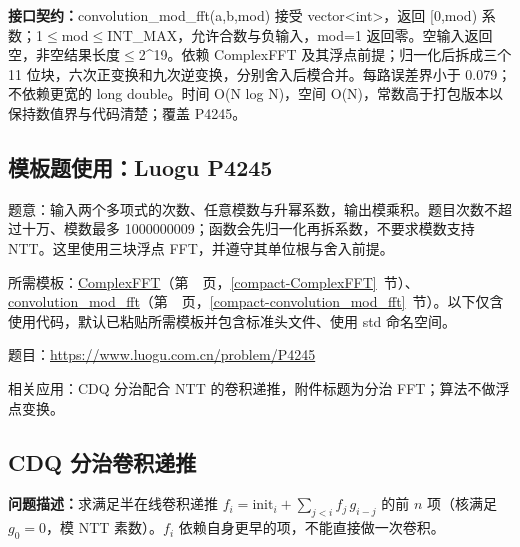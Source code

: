 {\sloppy{}\noindent\textbf{接口契约：}convolution\_mod\_fft(a,b,mod) 接受 vector<int>，返回 [0,mod) 系数；1$\le$mod$\le$INT\_MAX，允许合数与负输入，mod=1 返回零。空输入返回空，非空结果长度$\le$2\textasciicircum{}19。依赖 ComplexFFT 及其浮点前提；归一化后拆成三个 11 位块，六次正变换和九次逆变换，分别舍入后模合并。每路误差界小于 0.079；不依赖更宽的 long double。时间 O(N log N)，空间 O(N)，常数高于打包版本以保持数值界与代码清楚；覆盖 P4245。\par}



\Needspace{317pt}

\subsection*{模板题使用：Luogu P4245}

\label{usage-example-122}

题意：输入两个多项式的次数、任意模数与升幂系数，输出模乘积。题目次数不超过十万、模数最多 1000000009；函数会先归一化再拆系数，不要求模数支持 NTT。这里使用三块浮点 FFT，并遵守其单位根与舍入前提。

所需模板：\hyperref[compact-ComplexFFT]{ComplexFFT}（第~\pageref{compact-ComplexFFT}~页，\ref{compact-ComplexFFT}~节）、\hyperref[compact-convolution_mod_fft]{convolution\_\allowbreak{}mod\_\allowbreak{}fft}（第~\pageref{compact-convolution_mod_fft}~页，\ref{compact-convolution_mod_fft}~节）。以下仅含使用代码，默认已粘贴所需模板并包含标准头文件、使用 std 命名空间。

题目：\url{https://www.luogu.com.cn/problem/P4245}



\newpage

\Needspace{519pt}

\noindent 相关应用：CDQ 分治配合 NTT 的卷积递推，附件标题为分治 FFT；算法不做浮点变换。

\subsection{CDQ 分治卷积递推}\label{compact-cdq_convolution}

\noindent\textbf{问题描述：}\allowbreak 求满足半在线卷积递推 $f_i=\mathrm{init}_i+\sum_{j<i}f_j\,g_{i-j}$ 的前 $n$ 项（核满足 $g_0=0$，模 NTT 素数）。$f_i$ 依赖自身更早的项，不能直接做一次卷积。

